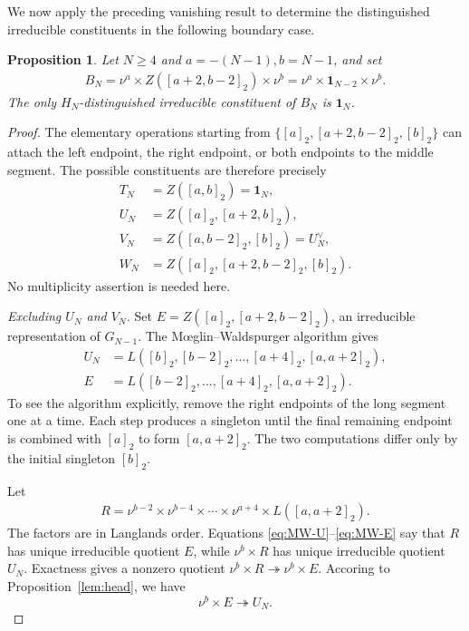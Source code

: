 \documentclass[11pt,leqno]{amsart}
\numberwithin{equation}{section}
\theoremstyle{plain}
\newtheorem{proposition}[theorem]{Proposition}
\theoremstyle{definition}
\theoremstyle{remark}
\newcommand{\one}{\mathbf{1}}
\newcommand{\onto}{\twoheadrightarrow}
\newcommand{\seg}[2]{[#1,#2]_2}
\newcommand{\sg}[1]{[#1]_2}
\begin{document}
	We now apply the preceding vanishing result to determine
	the distinguished irreducible constituents in the following boundary case.
	\begin{proposition}\label{lem:boundary}
		Let $N\ge4$ and $a=-(N-1), b=N-1$, and set
		\begin{align*}
			B_N=\nu^a\times Z(\seg{a+2}{b-2})\times\nu^b
			=\nu^a\times\one_{N-2}\times\nu^b.
		\end{align*}
		The only $H_N$-distinguished irreducible constituent of $B_N$
		is $\one_N$.
	\end{proposition}
	\begin{proof}
		The elementary operations starting from
		$\{\sg a,\seg{a+2}{b-2},\sg b\}$ can attach the left endpoint,
		the right endpoint, or both endpoints to the middle segment.
		The possible constituents are therefore precisely
		\begin{align}
			T_N&=Z(\seg a b)=\one_N,\label{eq:boundary-list}\\
			U_N&=Z(\sg a,\seg{a+2}b),\nonumber\\
			V_N&=Z(\seg a{b-2},\sg b)=U_N^\vee,\nonumber\\
			W_N&=Z(\sg a,\seg{a+2}{b-2},\sg b).\nonumber
		\end{align}
		No multiplicity assertion is needed here.
		
		\smallskip
		\noindent\emph{Excluding $U_N$ and $V_N$.}
		Set $E=Z(\sg a,\seg{a+2}{b-2})$, an irreducible representation
		of $G_{N-1}$. The M\oe glin--Waldspurger algorithm gives
		\begin{align}
			U_N&=L(\sg b,\sg{b-2},\ldots,\sg{a+4},\seg a{a+2}),\label{eq:MW-U}\\
			E&=L(\sg{b-2},\ldots,\sg{a+4},\seg a{a+2}).\label{eq:MW-E}
		\end{align}
		To see the algorithm explicitly, remove the right endpoints of the
		long segment one at a time. 
		Each step produces a singleton until the final remaining endpoint
		is combined with $\sg{a}$ to form $\seg{a}{a+2}$.
		The two computations differ only by the initial singleton $\sg b$.
		
		Let
		\begin{align*}
			R=\nu^{b-2}\times\nu^{b-4}\times\cdots\times\nu^{a+4}
			\times L(\seg a{a+2}).
		\end{align*}
		The factors are in Langlands order. Equations
		\eqref{eq:MW-U}--\eqref{eq:MW-E} say that $R$ has unique
		irreducible quotient $E$, while $\nu^b\times R$ has unique
		irreducible quotient $U_N$. 
		Exactness gives a nonzero quotient
		$\nu^b\times R\onto\nu^b\times E$. Accoring to Proposition~\ref{lem:head}, we have
		\begin{equation}\label{eq:U-presentation}
			\nu^b\times E\onto U_N.
		\end{equation}
		

\end{proof}
\end{document}
